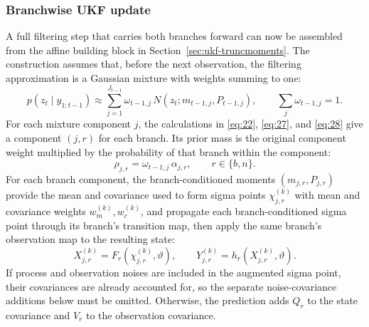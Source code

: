 \documentclass[11pt]{article}
\begin{document}
\subsubsection{Branchwise UKF update}
\label{sec:ukf-branchwise}

A full filtering step that carries both branches forward can now be assembled from the affine building block in Section~\ref{sec:ukf-truncmoments}. The construction assumes that, before the next observation, the filtering approximation is a Gaussian mixture with weights summing to one:
\begin{equation}\label{eq:36}
 p(z_t\mid y_{1:t-1})
 \approx\sum_{j=1}^{J_{t-1}}\omega_{t-1,j}\,
 N(z_t;m_{t-1,j},P_{t-1,j}),
 \qquad \sum_j\omega_{t-1,j}=1.
\end{equation}
For each mixture component $j$, the calculations in \eqref{eq:22}, \eqref{eq:27}, and \eqref{eq:28} give a component $(j,r)$ for each branch. Its prior mass is the original component weight multiplied by the probability of that branch within the component:
\begin{equation}\label{eq:37}
 \rho_{j,r}=\omega_{t-1,j}\,\alpha_{j,r},
 \qquad r\in\{b,n\}.
\end{equation}
For each branch component, the branch-conditioned moments $(m_{j,r},P_{j,r})$ provide the mean and covariance used to form sigma points $\chi_{j,r}^{(k)}$ with mean and covariance weights $w_m^{(k)},w_c^{(k)}$,
and propagate each branch-conditioned sigma point through its branch's transition map, then apply the same branch's observation map to the resulting state:
\begin{equation}\label{eq:38}
 X_{j,r}^{(k)}=F_r(\chi_{j,r}^{(k)},\vartheta),
 \qquad
 Y_{j,r}^{(k)}=h_r(X_{j,r}^{(k)},\vartheta).
\end{equation}
If process and observation noises are included in the augmented sigma point, their covariances are already accounted for, so the separate noise-covariance additions below must be omitted. Otherwise, the prediction adds $Q_r$ to the state covariance and $V_r$ to the observation covariance.
\end{document}

